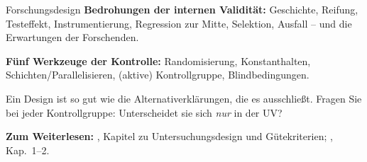 \begin{handout}{Forschungsdesign}
\textbf{Bedrohungen der internen Validität:} Geschichte, Reifung,
Testeffekt, Instrumentierung, Regression zur Mitte, Selektion, Ausfall
-- und die Erwartungen der Forschenden.

\textbf{Fünf Werkzeuge der Kontrolle:} Randomisierung, Konstanthalten,
Schichten/Parallelisieren, (aktive) Kontrollgruppe, Blindbedingungen.

\begin{merkbox}
Ein Design ist so gut wie die Alternativerklärungen, die es ausschließt.
Fragen Sie bei jeder Kontrollgruppe: Unterscheidet sie sich \emph{nur} in
der UV?
\end{merkbox}

\textbf{Zum Weiterlesen:} \textcite{doering2016forschungsmethoden},
Kapitel zu Untersuchungsdesign und Gütekriterien;
\textcite{shadish2002experimental}, Kap.~1--2.
\end{handout}

